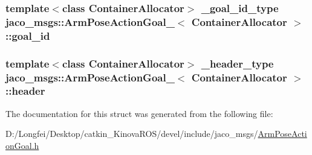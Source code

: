 \subsubsection[{\texorpdfstring{goal\+\_\+id}{goal_id}}]{\setlength{\rightskip}{0pt plus 5cm}template$<$class Container\+Allocator$>$ {\bf \+\_\+goal\+\_\+id\+\_\+type} {\bf jaco\+\_\+msgs\+::\+Arm\+Pose\+Action\+Goal\+\_\+}$<$ Container\+Allocator $>$\+::goal\+\_\+id}\hypertarget{structjaco__msgs_1_1ArmPoseActionGoal___a31706511987f26a7957034725c70f0d0}{}\label{structjaco__msgs_1_1ArmPoseActionGoal___a31706511987f26a7957034725c70f0d0}
\subsubsection[{\texorpdfstring{header}{header}}]{\setlength{\rightskip}{0pt plus 5cm}template$<$class Container\+Allocator$>$ {\bf \+\_\+header\+\_\+type} {\bf jaco\+\_\+msgs\+::\+Arm\+Pose\+Action\+Goal\+\_\+}$<$ Container\+Allocator $>$\+::header}\hypertarget{structjaco__msgs_1_1ArmPoseActionGoal___afb64a7a2cf0f0b1238fb648892309b73}{}\label{structjaco__msgs_1_1ArmPoseActionGoal___afb64a7a2cf0f0b1238fb648892309b73}


The documentation for this struct was generated from the following file\+:\begin{DoxyCompactItemize}
\item 
D\+:/\+Longfei/\+Desktop/catkin\+\_\+\+Kinova\+R\+O\+S/devel/include/jaco\+\_\+msgs/\hyperlink{ArmPoseActionGoal_8h}{Arm\+Pose\+Action\+Goal.\+h}\end{DoxyCompactItemize}
